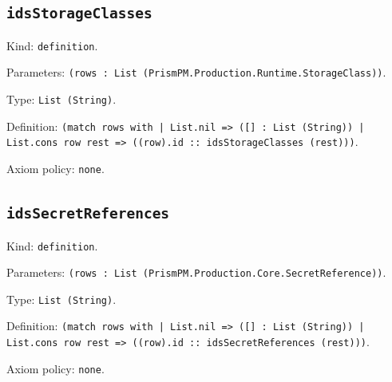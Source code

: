 \documentclass[11pt]{article}
\begin{document}
\subsection*{\texttt{idsStorageClasses}}
\noindent Kind: \texttt{definition}.\par
\noindent Parameters: \texttt{(rows : List (PrismPM.Production.Runtime.StorageClass))}.\par
\noindent Type: \texttt{List (String)}.\par
\noindent Definition: \texttt{(match rows with | List.nil => ([] : List (String)) | List.cons row rest => ((row).id :: idsStorageClasses (rest)))}.\par
\noindent Axiom policy: \texttt{none}.\par
\subsection*{\texttt{idsSecretReferences}}
\noindent Kind: \texttt{definition}.\par
\noindent Parameters: \texttt{(rows : List (PrismPM.Production.Core.SecretReference))}.\par
\noindent Type: \texttt{List (String)}.\par
\noindent Definition: \texttt{(match rows with | List.nil => ([] : List (String)) | List.cons row rest => ((row).id :: idsSecretReferences (rest)))}.\par
\noindent Axiom policy: \texttt{none}.\par
\end{document}
